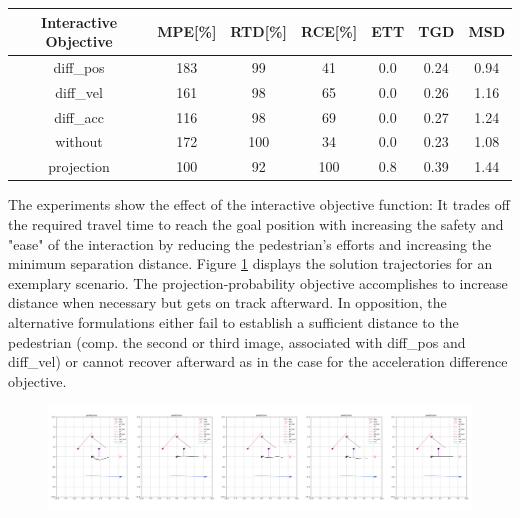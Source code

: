 \begin{table}[!ht]
\begin{center}
\begin{tabular}{c|c|c|c|c|c|c}
\bf Interactive Objective & \bf MPE[\%] & \bf RTD[\%] & \bf RCE[\%] & \bf ETT & \bf TGD & \bf MSD \\
\hline
diff\_pos & 183 & 99 & 41 & 0.0 & 0.24 & 0.94 \\
\hline
diff\_vel & 161 & 98 & 65 & 0.0 & 0.26 & 1.16 \\
\hline
diff\_acc & 116 & 98 & 69 & 0.0 & 0.27 & 1.24 \\ 
\hline
\rowcolor{baseline_color}
without & 172 & 100 & 34 & 0.0 & 0.23 & 1.08 \\ 
\hline
\rowcolor{our_color}
projection & 100 & 92 & 100 & 0.8 & 0.39 & 1.44 
\end{tabular}
\end{center}
\label{table:interactive_objective}
\end{table}

The experiments show the effect of the interactive objective function: It trades off the required travel time to reach the goal position with increasing the safety and "ease" of the interaction by reducing the pedestrian's efforts and increasing the minimum separation distance. Figure \ref{img:interactive_comp} displays the solution trajectories for an exemplary scenario.  The projection-probability objective accomplishes to increase distance when necessary but gets on track afterward. In opposition, the alternative formulations either fail to establish a sufficient distance to the pedestrian (comp. the second or third image, associated with diff\_pos and diff\_vel) or cannot recover afterward as in the case for the acceleration difference objective.

\begin{figure}[!ht]
\begin{center}
\includegraphics[width=\textwidth]{images/inter_comp_multi.png}
\label{img:interactive_comp}
\end{center}
\end{figure}

